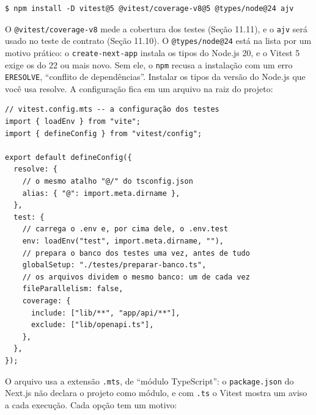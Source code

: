 \begin{codigo}
\begin{Verbatim}[breaklines=true, breaksymbolleft={}, fontsize=\footnotesize]
$ npm install -D vitest@5 @vitest/coverage-v8@5 @types/node@24 ajv
\end{Verbatim}
\end{codigo}

O \texttt{@vitest/coverage-v8} mede a cobertura dos testes (Seção 11.11), e o \texttt{ajv} será usado no teste de contrato (Seção 11.10). O \texttt{@types/node@24} está na lista por um motivo prático: o \texttt{create-next-app} instala os tipos do Node.js 20, e o Vitest 5 exige os do 22 ou mais novo. Sem ele, o \texttt{npm} recusa a instalação com um erro \texttt{ERESOLVE}, ``conflito de dependências''. Instalar os tipos da versão do Node.js que você usa resolve. A configuração fica em um arquivo na raiz do projeto:

\begin{codigo}
\begin{Verbatim}[breaklines=true, breaksymbolleft={}, fontsize=\footnotesize]
// vitest.config.mts -- a configuração dos testes
import { loadEnv } from "vite";
import { defineConfig } from "vitest/config";

export default defineConfig({
  resolve: {
    // o mesmo atalho "@/" do tsconfig.json
    alias: { "@": import.meta.dirname },
  },
  test: {
    // carrega o .env e, por cima dele, o .env.test
    env: loadEnv("test", import.meta.dirname, ""),
    // prepara o banco dos testes uma vez, antes de tudo
    globalSetup: "./testes/preparar-banco.ts",
    // os arquivos dividem o mesmo banco: um de cada vez
    fileParallelism: false,
    coverage: {
      include: ["lib/**", "app/api/**"],
      exclude: ["lib/openapi.ts"],
    },
  },
});
\end{Verbatim}
\end{codigo}

O arquivo usa a extensão \texttt{.mts}, de ``módulo TypeScript'': o \texttt{package.json} do Next.js não declara o projeto como módulo, e com \texttt{.ts} o Vitest mostra um aviso a cada execução. Cada opção tem um motivo:

